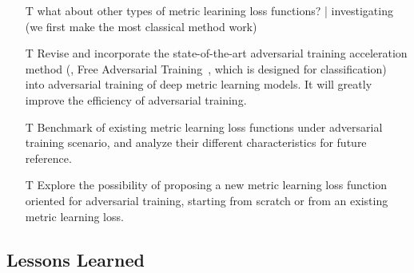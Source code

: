 \begin{itemize}
	\item [T]  what about other types of metric learining loss functions? |
		investigating (we first make the most classical method work)

	\item [T] Revise and incorporate the state-of-the-art adversarial training
		acceleration method (\ie, Free Adversarial Training~\cite{freeat},
		which is designed for classification) into adversarial training of 
		deep metric learning models. It will greatly improve the efficiency
		of adversarial training.
	\item [T] Benchmark of existing metric learning loss functions under
		adversarial training scenario, and analyze their different
		characteristics for future reference.
	\item [T] Explore the possibility of proposing a new metric learning loss
		function oriented for adversarial training, starting from scratch or
		from an existing metric learning loss.
\end{itemize}

\subsection{Lessons Learned}



